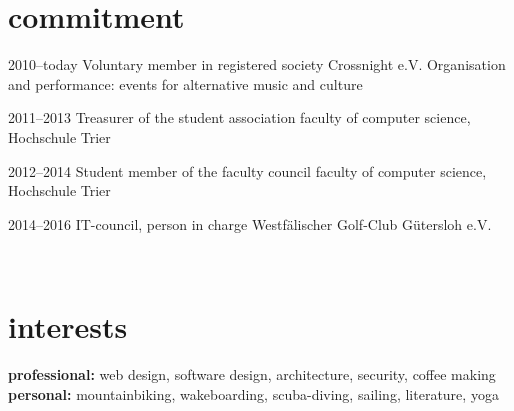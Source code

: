 \documentclass[]{friggeri-cv} %
\begin{document}
\newpage

\section{commitment}

\begin{entrylist}


\entry
{2010--today}
{Voluntary member in registered society Crossnight e.V.}
{}
{Organisation and performance: events for alternative music and culture}


\entry
{2011--2013}
{Treasurer of the student association}
{}
{faculty of computer science, Hochschule Trier}


\entry
{2012--2014}
{Student member of the faculty council}
{}
{faculty of computer science, Hochschule Trier}


\entry
{2014--2016}
{IT-council, person in charge}
{}
{Westf\"{a}lischer Golf-Club G\"{u}tersloh e.V.}

\\
\end{entrylist}


\section{interests}
\textbf{professional:} web design, software design, architecture, security, coffee making
\\
\textbf{personal:} mountainbiking, wakeboarding, scuba-diving, sailing, literature, yoga

\end{document}
